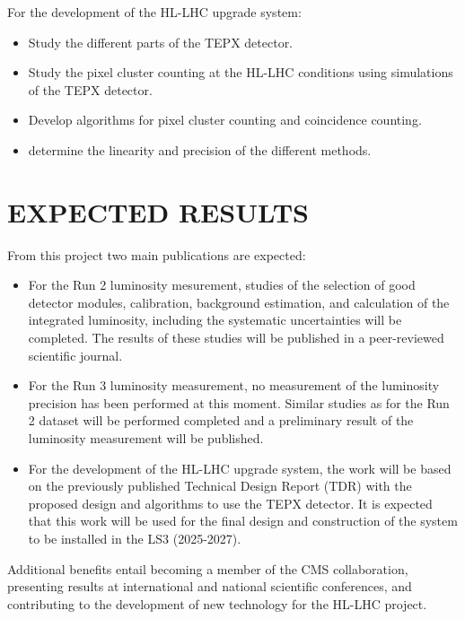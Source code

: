 \documentclass[final,12p]{article}
\begin{document}
\par
For the development of the HL-LHC upgrade system:
\begin{itemize}
\item Study the different parts of the TEPX detector.
\item Study the pixel cluster counting at the HL-LHC conditions using simulations of the TEPX detector.
\item Develop algorithms for pixel  cluster counting and coincidence counting.
\item determine the linearity and  precision of the different methods.
\end{itemize}


\newpage
\section{EXPECTED RESULTS}

From this project two main publications are expected:
\begin{itemize}
\item For the Run 2 luminosity mesurement, studies of the selection of good detector modules, calibration, background estimation, and calculation of the integrated luminosity, including the systematic uncertainties will be completed.
The results of these studies will be published in a peer-reviewed scientific journal.
\item For the Run 3 luminosity measurement, no measurement of the luminosity precision has been performed at this moment.
Similar studies as for the Run 2 dataset will be performed completed and a preliminary result of the luminosity measurement will be published.
\item For the development of the HL-LHC upgrade system, the work  will be based on the previously published Technical Design Report (TDR) with the proposed design and algorithms to use the TEPX detector.
It is expected that this work will be used for the final design and construction of the system to be installed in the LS3 (2025-2027).  
\end{itemize}

Additional benefits entail becoming a member of the CMS collaboration, presenting results at international and national scientific conferences, and contributing to the development of new technology for the HL-LHC project.
\end{document}
